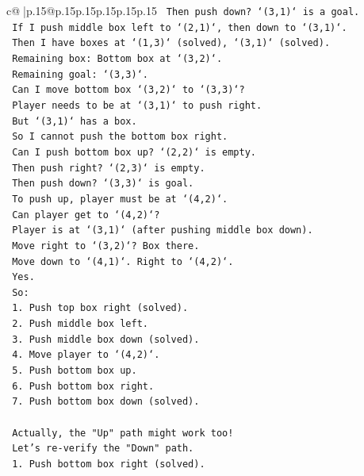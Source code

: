 \documentclass{article}
\begin{document}
{\begin{supertabular}{c@{$\;$}|p{.15\linewidth}@{}p{.15\linewidth}p{.15\linewidth}p{.15\linewidth}p{.15\linewidth}p{.15\linewidth}}
{{{\texttt{    Then push down? `(3,1)` is a goal.} \\
\texttt{    If I push middle box left to `(2,1)`, then down to `(3,1)`.} \\
\texttt{    Then I have boxes at `(1,3)` (solved), `(3,1)` (solved).} \\
\texttt{    Remaining box: Bottom box at `(3,2)`.} \\
\texttt{    Remaining goal: `(3,3)`.} \\
\texttt{    Can I move bottom box `(3,2)` to `(3,3)`?} \\
\texttt{    Player needs to be at `(3,1)` to push right.} \\
\texttt{    But `(3,1)` has a box.} \\
\texttt{    So I cannot push the bottom box right.} \\
\texttt{    Can I push bottom box up? `(2,2)` is empty.} \\
\texttt{    Then push right? `(2,3)` is empty.} \\
\texttt{    Then push down? `(3,3)` is goal.} \\
\texttt{    To push up, player must be at `(4,2)`.} \\
\texttt{    Can player get to `(4,2)`?} \\
\texttt{    Player is at `(3,1)` (after pushing middle box down).} \\
\texttt{    Move right to `(3,2)`? Box there.} \\
\texttt{    Move down to `(4,1)`. Right to `(4,2)`.} \\
\texttt{    Yes.} \\
\texttt{    So:} \\
\texttt{    1. Push top box right (solved).} \\
\texttt{    2. Push middle box left.} \\
\texttt{    3. Push middle box down (solved).} \\
\texttt{    4. Move player to `(4,2)`.} \\
\texttt{    5. Push bottom box up.} \\
\texttt{    6. Push bottom box right.} \\
\texttt{    7. Push bottom box down (solved).} \\
\\ 
\texttt{    Actually, the "Up" path might work too!} \\
\texttt{    Let's re{-}verify the "Down" path.} \\
\texttt{    1. Push bottom box right (solved).} \\
}}}
\end{supertabular}}
\end{document}
